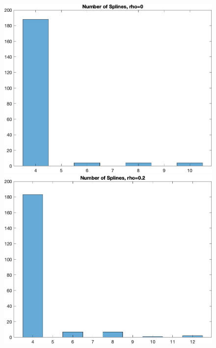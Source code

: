 \documentclass[
]{article}
\begin{document}
\begin{figure}

\begin{minipage}{0.50\linewidth}
\includegraphics{../figures/hist_n_spli_rho-0_quadratic_splines.png}\end{minipage}%
%
\begin{minipage}{0.50\linewidth}
\includegraphics{../figures/hist_n_spli_rho-0.2_quadratic_splines.png}\end{minipage}%
\newline
\begin{minipage}{0.50\linewidth}

\end{minipage}
\end{figure}
\end{document}
